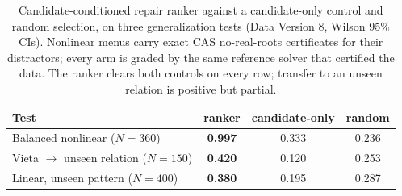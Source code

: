 \documentclass[11pt]{article}
\begin{document}
\begin{table}[t]
\centering
\caption{Candidate-conditioned repair ranker against a candidate-only control and random
selection, on three generalization tests (Data Version 8, Wilson 95\% CIs). Nonlinear menus
carry exact CAS no-real-roots certificates for their distractors; every arm is graded by the
same reference solver that certified the data. The ranker clears both controls on every row;
transfer to an unseen relation is positive but partial.}
\label{tab:repair}
\begin{tabular}{lccc}
\toprule
Test & ranker & candidate-only & random \\
\midrule
Balanced nonlinear ($N{=}360$)          & \textbf{0.997} & 0.333 & 0.236 \\
Vieta $\to$ unseen relation ($N{=}150$) & \textbf{0.420} & 0.120 & 0.253 \\
Linear, unseen pattern ($N{=}400$)      & \textbf{0.380} & 0.195 & 0.287 \\
\bottomrule
\end{tabular}
\end{table}
\end{document}
